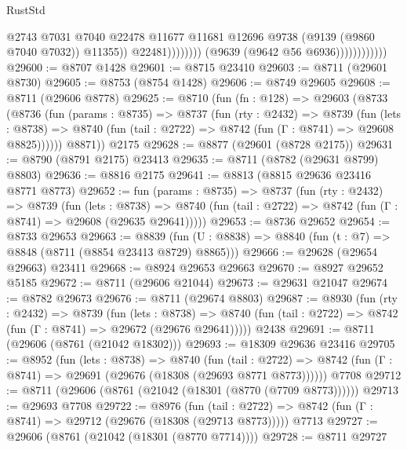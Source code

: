 \begin{lexlean}{RustStd}
\begin{coremodule}
                                            @2743
                                            @7031
                                            @7040
                                            @22478
                                            @11677
                                            @11681
                                            @12696
                                            @9738
                                            (@9139 (@9860 @7040 @7032))
                                            @11355))
                                        @22481))))))))
                        (@9639 (@9642 @56 @6936))))))))))))
@29600 := @8707 @1428
@29601 := @8715 @23410
@29603 := @8711 (@29601 @8730)
@29605 := @8753 (@8754 @1428)
@29606 := @8749 @29605
@29608 := @8711 (@29606 @8778)
@29625 := @8710
    (fun (fn : @128) =>
    @29603
      (@8733
        (@8736
          (fun (params : @8735) =>
          @8737
            (fun (rty : @2432) =>
            @8739
              (fun (lets : @8738) =>
              @8740 (fun (tail : @2722) => @8742 (fun (Γ : @8741) => @29608 @8825))))))
        @8871))
    @2175
@29628 := @8877 (@29601 (@8728 @2175))
@29631 := @8790 (@8791 @2175) @23413
@29635 := @8711 (@8782 (@29631 @8799) @8803)
@29636 := @8816 @2175
@29641 := @8813 (@8815 @29636 @23416 @8771 @8773)
@29652 := fun (params : @8735) =>
  @8737
    (fun (rty : @2432) =>
    @8739
      (fun (lets : @8738) =>
      @8740 (fun (tail : @2722) => @8742 (fun (Γ : @8741) => @29608 (@29635 @29641)))))
@29653 := @8736 @29652
@29654 := @8733 @29653
@29663 := @8839
    (fun (U : @8838) => @8840 (fun (t : @7) => @8848 (@8711 (@8854 @23413 @8729) @8865)))
@29666 := @29628 (@29654 @29663) @23411
@29668 := @8924 @29653 @29663
@29670 := @8927 @29652 @5185
@29672 := @8711 (@29606 @21044)
@29673 := @29631 @21047
@29674 := @8782 @29673
@29676 := @8711 (@29674 @8803)
@29687 := @8930
    (fun (rty : @2432) =>
    @8739
      (fun (lets : @8738) =>
      @8740 (fun (tail : @2722) => @8742 (fun (Γ : @8741) => @29672 (@29676 @29641)))))
    @2438
@29691 := @8711 (@29606 (@8761 (@21042 @18302)))
@29693 := @18309 @29636 @23416
@29705 := @8952
    (fun (lets : @8738) =>
    @8740
      (fun (tail : @2722) =>
      @8742 (fun (Γ : @8741) => @29691 (@29676 (@18308 (@29693 @8771 @8773))))))
    @7708
@29712 := @8711 (@29606 (@8761 (@21042 (@18301 (@8770 (@7709 @8773))))))
@29713 := @29693 @7708
@29722 := @8976
    (fun (tail : @2722) => @8742 (fun (Γ : @8741) => @29712 (@29676 (@18308 (@29713 @8773)))))
    @7713
@29727 := @29606 (@8761 (@21042 (@18301 (@8770 @7714))))
@29728 := @8711 @29727

\end{coremodule}
\end{lexlean}
